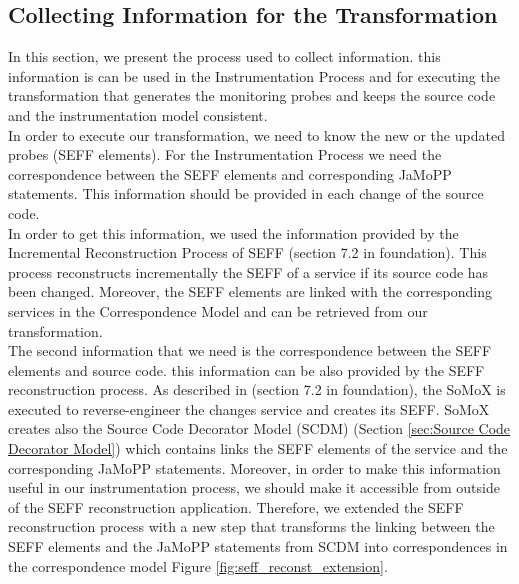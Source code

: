 \subsection{Collecting Information for the Transformation}
\label{sec:Collecting Information for the Transformation}
In this section, we present the process used to collect information. this information is can be used in the Instrumentation Process and for executing the transformation that generates the monitoring probes and keeps the source code and the instrumentation model consistent.\\

In order to execute our transformation, we need to know the new or the updated probes (SEFF elements).  For the Instrumentation Process we need the correspondence between the SEFF elements and corresponding JaMoPP statements. This information should be provided in each change of the source code. \\

In order to get this information, we used the information provided by the Incremental Reconstruction Process of SEFF (section 7.2 in foundation). This process reconstructs incrementally the SEFF of a service if its source code has been changed. Moreover, the SEFF elements are linked with the corresponding services in the Correspondence Model and can be retrieved from our transformation.\\

The second information that we need is the correspondence between the SEFF elements and source code. this information can be also provided by the SEFF reconstruction process. As described in (section 7.2 in foundation), the SoMoX is executed to reverse-engineer the changes service and creates its SEFF. SoMoX creates also the Source Code Decorator Model (SCDM) (Section \ref{sec:Source Code Decorator Model}) which contains links the SEFF elements of the service and the corresponding JaMoPP statements. Moreover, in order to make this information useful in our instrumentation process, we should make it accessible from outside of the SEFF reconstruction application. Therefore, we extended the SEFF reconstruction process with a new step that transforms the linking between the SEFF elements and the JaMoPP statements from SCDM into correspondences in the correspondence model Figure \ref{fig:seff_reconst_extension}. \\


